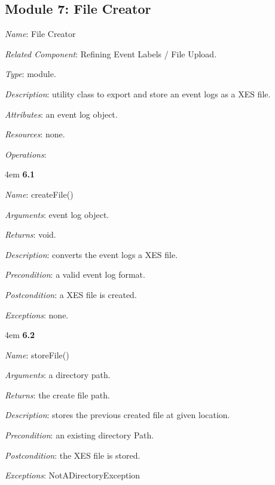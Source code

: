 \documentclass[notitlepage]{article}
\begin{document}
\begin{flushleft}
\subsection{Module 7: File Creator}
\textit{Name}: File Creator

\textit{Related Component}: Refining Event Labels / File Upload.

\textit{Type}: module.

\textit{Description}: utility class to export and store an event logs as a XES file.

\textit{Attributes}: an event log object.

\textit{Resources}: none.

\textit{Operations}: 
\medskip
\par
\begingroup
\leftskip4em
\textbf{6.1} 

\textit{Name}: createFile()

\textit{Arguments}: event log object.

\textit{Returns}: void.

\textit{Description}: converts the event logs a XES file.

\textit{Precondition}: a valid event log format.

\textit{Postcondition}: a XES file is created.

\textit{Exceptions}: none.
\par
\endgroup

\medskip
\par
\begingroup
\leftskip4em
\textbf{6.2} 

\textit{Name}: storeFile()

\textit{Arguments}: a directory path.

\textit{Returns}: the create file path.

\textit{Description}: stores the previous created file at given location.

\textit{Precondition}: an existing directory Path.

\textit{Postcondition}: the XES file is stored.

\textit{Exceptions}: NotADirectoryException
\par
\endgroup


\end{flushleft}
\end{document}
